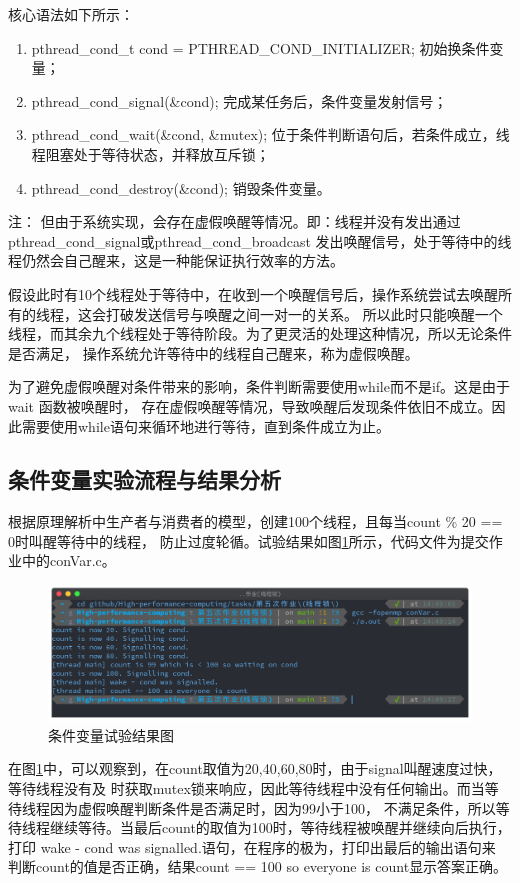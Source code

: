 \documentclass[11pt]{ctexart}
\newenvironment{note}{\kaishu 注：}{}
\begin{document}
核心语法如下所示：
\begin{enumerate}
    \item {\ttfamily pthread\_cond\_t cond = PTHREAD\_COND\_INITIALIZER;} 初始换条件变量；
    \item {\ttfamily pthread\_cond\_signal(\&cond);} 完成某任务后，条件变量发射信号；
    \item {\ttfamily pthread\_cond\_wait(\&cond, \&mutex);} 位于条件判断语句后，若条件成立，线程阻塞处于等待状态，并释放互斥锁；
    \item {\ttfamily pthread\_cond\_destroy(\&cond);} 销毁条件变量。
\end{enumerate}

\begin{note}
但由于系统实现，会存在虚假唤醒等情况。即：线程并没有发出通过{\ttfamily pthread\_cond\_signal}或{\ttfamily pthread\_cond\_broadcast}
发出唤醒信号，处于等待中的线程仍然会自己醒来，这是一种能保证执行效率的方法。

假设此时有10个线程处于等待中，在收到一个唤醒信号后，操作系统尝试去唤醒所有的线程，这会打破发送信号与唤醒之间一对一的关系。
所以此时只能唤醒一个线程，而其余九个线程处于等待阶段。为了更灵活的处理这种情况，所以无论条件是否满足，
操作系统允许等待中的线程自己醒来，称为虚假唤醒。

为了避免虚假唤醒对条件带来的影响，条件判断需要使用{\ttfamily while}而不是{\ttfamily if}。这是由于 wait 函数被唤醒时，
存在虚假唤醒等情况，导致唤醒后发现条件依旧不成立。因此需要使用{\ttfamily while}语句来循环地进行等待，直到条件成立为止。
\end{note}

\subsection{条件变量实验流程与结果分析}

根据原理解析中生产者与消费者的模型，创建100个线程，且每当{\ttfamily count \% 20 == 0}时叫醒等待中的线程，
防止过度轮循。试验结果如图\ref{cond}所示，代码文件为提交作业中的{\ttfamily conVar.c}。

\begin{figure}[h]
    \centering
    \includegraphics[scale=0.4]{../cond.png}
    \caption{条件变量试验结果图}
    \label{cond}
\end{figure}

在图\ref{cond}中，可以观察到，在{\ttfamily count}取值为20,40,60,80时，由于{\ttfamily signal}叫醒速度过快，等待线程没有及
时获取{\ttfamily mutex}锁来响应，因此等待线程中没有任何输出。而当等待线程因为虚假唤醒判断条件是否满足时，因为99小于100，
不满足条件，所以等待线程继续等待。当最后{\ttfamily count}的取值为100时，等待线程被唤醒并继续向后执行，打印
{ wake - cond was signalled.}语句，在程序的极为，打印出最后的输出语句来
判断{\ttfamily count}的值是否正确，结果{ count == 100 so everyone is count}显示答案正确。
\end{document}
